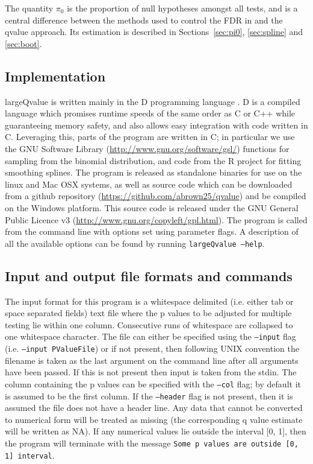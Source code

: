 \documentclass{amsart}
\begin{document}
The quantity $\pi_0$ is the proportion of null hypotheses amongst all tests, and is a central difference between the methods used to control the FDR in \citet{fdr} and the qvalue approach. Its estimation is described in Sections~\ref{sec:pi0}, \ref{sec:spline} and \ref{sec:boot}.

\subsection{Implementation}

largeQvalue is written mainly in the D programming language \citep{dlang}. D is a compiled language which promises runtime speeds of the same order as C or C++ while guaranteeing memory safety, and also allows easy integration with code written in C. Leveraging this, parts of the program are written in C; in particular we use the GNU Software Library (\url{http://www.gnu.org/software/gsl/}) functions for sampling from the binomial distribution, and code from the R project \citep{R} for fitting smoothing splines. The program is released as standalone binaries for use on the linux and Mac OSX systems, as well as source code which can be downloaded from a github repository (\url{https://github.com/abrown25/qvalue}) and be compiled on the Windows platform. This source code is released under the GNU General Public Licence v3 (\url{http://www.gnu.org/copyleft/gpl.html}). The program is called from the command line with options set using parameter flags. A description of all the available options can be found by running \texttt{largeQvalue --help}.

\subsection{Input and output file formats and commands}

The input format for this program is a whitespace delimited (i.e. either tab or space separated fields) text file where the p values to be adjusted for multiple testing lie within one column. Consecutive runs of whitespace are collapsed to one whitespace character. The file can either be specified using the \texttt{--input} flag (i.e. \texttt{--input PValueFile}) or if not present, then following UNIX convention the filename is taken as the last argument on the command line after all arguments have been passed. If this is not present then input is taken from the stdin. The column containing the p values can be specified with the \texttt{--col} flag; by default it is assumed to be the first column. If the \texttt{--header} flag is not present, then it is assumed the file does not have a header line. Any data that cannot be converted to numerical form will be treated as missing (the corresponding q value estimate will be written as NA). If any numerical values lie outside the interval [0, 1], then the program will terminate with the message \texttt{Some p values are outside [0, 1] interval}.
\end{document}

